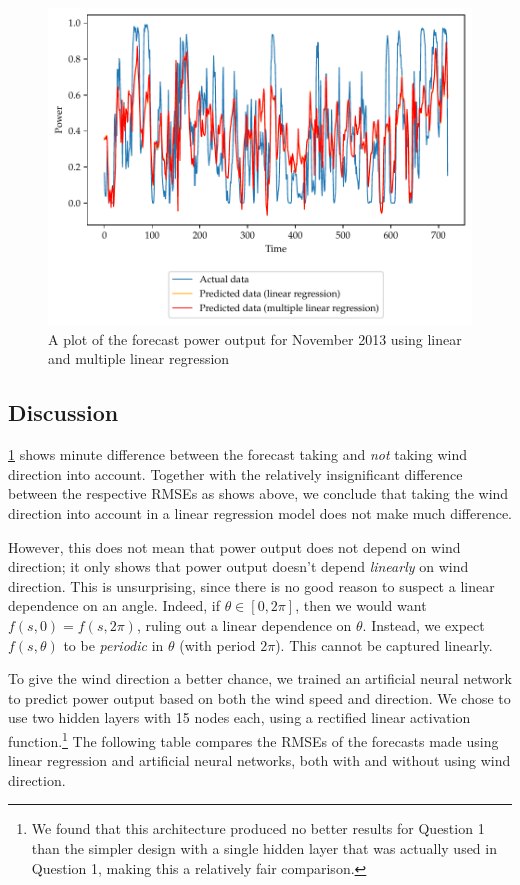 \documentclass[11pt]{article}
\begin{document}
\begin{figure}
  \centering
  \includegraphics{figures/q2_forecast_plot}
  \caption{A plot of the forecast power output for November 2013 using linear and multiple linear regression}
  \label{fig:q2-forecast}
\end{figure}



\subsection*{Discussion}

\cref{fig:q2-forecast} shows minute difference between the forecast taking and \emph{not} taking wind direction into account.
Together with the relatively insignificant difference between the respective RMSEs as shows above, we conclude that taking the wind direction into account in a linear regression model does not make much difference.

However, this does not mean that power output does not depend on wind direction; it only shows that power output doesn't depend \emph{linearly} on wind direction.
This is unsurprising, since there is no good reason to suspect a linear dependence on an angle.
Indeed, if $\theta \in [0, 2\pi]$, then we would want $f(s, 0) = f(s, 2\pi)$, ruling out a linear dependence on $\theta$.
Instead, we expect $f(s, \theta)$ to be \emph{periodic} in $\theta$ (with period $2\pi$).
This cannot be captured linearly.

To give the wind direction a better chance, we trained an artificial neural network to predict power output based on both the wind speed and direction.
We chose to use two hidden layers with 15 nodes each, using a rectified linear activation function.\footnote{We found that this architecture produced no better results for Question 1 than the simpler design with a single hidden layer that was actually used in Question 1, making this a relatively fair comparison.}
The following table compares the RMSEs of the forecasts made using linear regression and artificial neural networks, both with and without using wind direction.
\begin{center}
\end{center}
\end{document}
